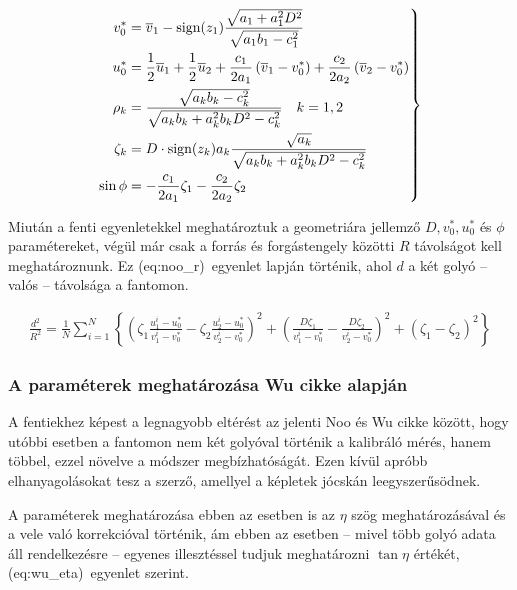 \documentclass[a4paper,12pt]{article}
\begin{document}
\begin{equation}
\label{eq:noo_tobbi}
\left.
\begin{split}
v_0^* &= \overline{v}_1 - \text{sign} (z_1) \frac {\sqrt{a_1 + a_1^2D^2    }}{\sqrt{a_1b_1-c_1^2}}\\
u_0^* &= \frac{1}{2} \overline{u}_1  + \frac{1}{2} \overline{u}_2 + \frac{c_1}{2a_1} \left ( \overline{v}_1 - v_0^* \right) + \frac{c_2}{2a_2} \left (\overline{v}_2 - v_0^* \right)\\
\rho_k &= \frac{\sqrt{a_kb_k-c_k^2}}{\sqrt{a_kb_k+a_k^2b_kD^2-c_k^2}}  \hskip10pt k = 1,2\\
\zeta_k &= D \cdot \text{sign}(z_k)a_k \frac{\sqrt{a_k}}{\sqrt{a_kb_k+a_k^2b_kD^2-c_k^2}}\\
\sin \phi & = -\frac{c_1}{2a_1}  \zeta_1 - \frac{c_2}{2a_2} \zeta_2
\end{split}
\right \}
\end{equation}


Miután a fenti egyenletekkel meghatároztuk a geometriára jellemző $D, v_0^*, u_0^*$ és $\phi$ paramétereket, végül már csak a forrás és forgástengely közötti $R$ távolságot kell meghatároznunk. Ez \aref({eq:noo_r})~egyenlet lapján történik, ahol $d$ a két golyó -- valós -- távolsága a fantomon.

\begin{equation}
\label{eq:noo_r}
\begin{split}
\frac{d^2}{R^2} = \frac{1}{N} \sum_{i=1}^{N} \left\{ \left ( \zeta_1 \frac{u_1^i - u_0^*}{v_1^i - v_0^*}  - \zeta_2 \frac{u_2^i - u_0^*}{v_2^i - v_0^*} \right)^2 + \left( \frac{D \zeta_1}{v_1^i - v_0^*} - \frac{D \zeta_2}{v_2^i - v_0^*} \right)^2 + \left ( \zeta_1 - \zeta_2 \right) ^2 \right\}
\end{split}
\end{equation}


\subsubsection{A paraméterek meghatározása Wu\cite{wu} cikke alapján}
\label{sec:wu}


A fentiekhez képest a legnagyobb eltérést az jelenti Noo és Wu cikke között, hogy utóbbi esetben a fantomon nem két golyóval történik a kalibráló mérés, hanem többel, ezzel növelve a módszer megbízhatóságát. Ezen kívül apróbb elhanyagolásokat tesz a szerző, amellyel a képletek jócskán leegyszerűsödnek. 

A paraméterek meghatározása ebben az esetben is az $\eta$ szög meghatározásával és a vele való korrekcióval történik, ám ebben az esetben -- mivel több golyó adata áll rendelkezésre -- egyenes illesztéssel tudjuk meghatározni $\tan \eta$ értékét, \aref({eq:wu_eta})~egyenlet szerint.
\end{document}
